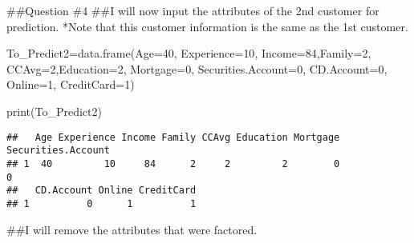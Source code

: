 \documentclass[
]{article}
\newenvironment{Shaded}{\begin{snugshade}}{\end{snugshade}}
\newcommand{\AttributeTok}[1]{\textcolor[rgb]{0.77,0.63,0.00}{#1}}
\newcommand{\ConstantTok}[1]{\textcolor[rgb]{0.00,0.00,0.00}{#1}}
\newcommand{\DecValTok}[1]{\textcolor[rgb]{0.00,0.00,0.81}{#1}}
\newcommand{\FunctionTok}[1]{\textcolor[rgb]{0.00,0.00,0.00}{#1}}
\newcommand{\NormalTok}[1]{#1}
\newcommand{\OtherTok}[1]{\textcolor[rgb]{0.56,0.35,0.01}{#1}}
\newcommand{\SpecialCharTok}[1]{\textcolor[rgb]{0.00,0.00,0.00}{#1}}
\begin{document}
\#\#Question \#4 \#\#I will now input the attributes of the 2nd customer
for prediction. *Note that this customer information is the same as the
1st customer.

\begin{Shaded}
\begin{Highlighting}[]
\NormalTok{To\_Predict2}\OtherTok{=}\FunctionTok{data.frame}\NormalTok{(}\AttributeTok{Age=}\DecValTok{40}\NormalTok{, }\AttributeTok{Experience=}\DecValTok{10}\NormalTok{,}
                      \AttributeTok{Income=}\DecValTok{84}\NormalTok{,}\AttributeTok{Family=}\DecValTok{2}\NormalTok{,}
                      \AttributeTok{CCAvg=}\DecValTok{2}\NormalTok{,}\AttributeTok{Education=}\DecValTok{2}\NormalTok{,}
                      \AttributeTok{Mortgage=}\DecValTok{0}\NormalTok{,}
                      \AttributeTok{Securities.Account=}\DecValTok{0}\NormalTok{,}
                      \AttributeTok{CD.Account=}\DecValTok{0}\NormalTok{,}
                      \AttributeTok{Online=}\DecValTok{1}\NormalTok{,}
                      \AttributeTok{CreditCard=}\DecValTok{1}\NormalTok{)}

\FunctionTok{print}\NormalTok{(To\_Predict2)}
\end{Highlighting}
\end{Shaded}

\begin{verbatim}
##   Age Experience Income Family CCAvg Education Mortgage Securities.Account
## 1  40         10     84      2     2         2        0                  0
##   CD.Account Online CreditCard
## 1          0      1          1
\end{verbatim}

\#\#I will remove the attributes that were factored.

\begin{Shaded}
\end{Shaded}
\end{document}
